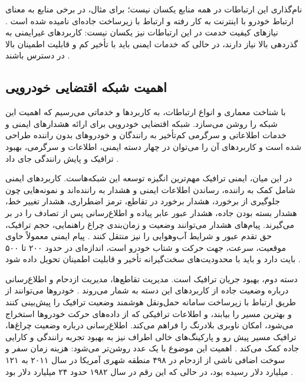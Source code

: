 نام‌گذاری این ارتباطات در همه منابع یکسان نیست؛ برای مثال، در برخی منابع  به معنای ارتباط خودرو با اینترنت به کار رفته و ارتباط با زیرساخت جاده‌ای  نامیده شده است \cite{luConnectedVehiclesSolutions2014}. نیازهای کیفیت خدمت  در این ارتباطات نیز یکسان نیست: کاربردهای غیرایمنی به گذردهی بالا نیاز دارند، در حالی که خدمات ایمنی باید با تأخیر کم و قابلیت اطمینان بالا در دسترس باشند \cite{hozouriOverviewVANETVehicular2023}.

\subsection{اهمیت شبکه اقتضایی خودرویی}

با شناخت معماری و انواع ارتباطات، به کاربردها و خدماتی می‌رسیم که اهمیت این شبکه را روشن می‌سازد. شبکه اقتضایی خودرویی برای ارائه هشدارهای ایمنی و خدمات اطلاعاتی و سرگرمی کم‌تأخیر به رانندگان و خودروهای بدون راننده طراحی شده است و کاربردهای آن را می‌توان در چهار دسته ایمنی، اطلاعات و سرگرمی، بهبود ترافیک و پایش رانندگی جای داد \cite{hozouriOverviewVANETVehicular2023}.

در این میان، ایمنی ترافیک مهم‌ترین انگیزه توسعه این شبکه‌هاست. کاربردهای ایمنی شامل کمک به راننده، رساندن اطلاعات ایمنی و هشدار به راننده‌اند و نمونه‌هایی چون جلوگیری از برخورد، هشدار برخورد در تقاطع، ترمز اضطراری، هشدار تغییر خط، هشدار بسته بودن جاده، هشدار عبور عابر پیاده و اطلاع‌رسانی پس از تصادف را در بر می‌گیرند. پیام‌های هشدار می‌توانند وضعیت و زمان‌بندی چراغ راهنمایی، حجم ترافیک، حق تقدم عبور و شرایط آب‌وهوایی را نیز منتقل کنند \cite{hozouriOverviewVANETVehicular2023}. پیام ایمنی معمولاً حاوی موقعیت، سرعت، جهت حرکت و شتاب خودرو است، اندازه‌ای در حدود ۲۰۰ تا ۵۰۰ بایت دارد و باید با محدودیت‌های سخت‌گیرانه تأخیر و قابلیت اطمینان تحویل داده شود \cite{xuInternetVehiclesBig2018}.

دسته دوم، بهبود جریان ترافیک است. مدیریت تقاطع‌ها، مدیریت ازدحام و اطلاع‌رسانی درباره وضعیت جاده از کاربردهای این دسته به شمار می‌روند \cite{hozouriOverviewVANETVehicular2023}. خودروها می‌توانند از طریق ارتباط با زیرساخت سامانه حمل‌ونقل هوشمند وضعیت ترافیک را پیش‌بینی کنند و بهترین مسیر را بیابند، و اطلاعات ترافیکی که از داده‌های حرکت خودروها استخراج می‌شود، امکان ناوبری بلادرنگ را فراهم می‌کند. اطلاع‌رسانی درباره وضعیت چراغ‌ها، ترافیک مسیر پیش رو و پارکینگ‌های خالی اطراف نیز به بهبود تجربه رانندگی و کارایی جاده کمک می‌کند \cite{xuInternetVehiclesBig2018}. اهمیت این موضوع با یک عدد روشن‌تر می‌شود: هزینه زمان سفر و سوخت اضافی ناشی از ازدحام در ۴۹۸ منطقه شهری آمریکا در سال ۲۰۱۱ به ۱۲۱ میلیارد دلار رسیده بود، در حالی که این رقم در سال ۱۹۸۲ حدود ۲۴ میلیارد دلار بود \cite{luConnectedVehiclesSolutions2014}.

